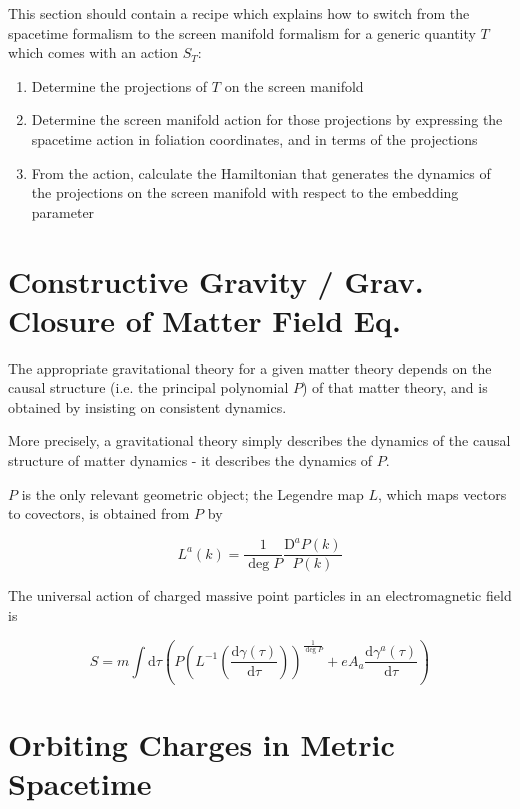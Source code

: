 \documentclass[11pt]{article}
\begin{document}
This section should contain a recipe which explains how to switch from the spacetime formalism to the screen manifold formalism for a generic quantity $T$ which comes with an action $S_T$:
\begin{enumerate}
	\item Determine the projections of $T$ on the screen manifold
	\item Determine the screen manifold action for those projections by expressing the spacetime action in foliation coordinates, and in terms of the projections
	\item From the action, calculate the Hamiltonian that generates the dynamics of the projections on the screen manifold with respect to the embedding parameter
\end{enumerate}


\section{Constructive Gravity / Grav. Closure of Matter Field Eq. }

The appropriate gravitational theory for a given matter theory depends on the causal structure (i.e. the principal polynomial $P$) of that matter theory, and is obtained by insisting on consistent dynamics. 

More precisely, a gravitational theory simply describes the dynamics of the causal structure of matter dynamics - it describes the dynamics of $P$.

$P$ is the only relevant geometric object; the Legendre map $L$, which maps vectors to covectors, is obtained from $P$ by

\begin{equation}
	L^a \left( k \right) = \frac{1}{\deg{P}}\frac{\mathrm{D}^a P \left( k \right)}{P\left(k\right)}
\end{equation}

The universal action of charged massive point particles in an electromagnetic field is

\begin{equation} \label{act_pp_univ}
	S = m \int \mathrm{d}\tau 
	\left(
		P 
		\left(
			L^{-1} 
			\left( 
				\frac{\mathrm{d} \gamma\left(\tau \right)}{\mathrm{d}\tau} 
			\right) 
		\right)^{\frac{1}{\deg{P}}}
		+ e A_a \frac{\mathrm{d} \gamma^a\left(\tau \right)}{\mathrm{d}\tau} 
	\right)
\end{equation}

\section{Orbiting Charges in Metric Spacetime}
\end{document}
